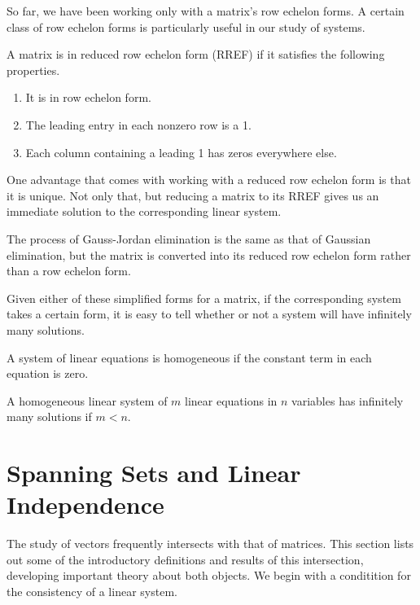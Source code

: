 \documentclass[../m73main.tex]{subfiles}
\begin{document}
So far, we have been working only with a matrix's row echelon forms.
A certain class of row echelon forms is particularly useful in our study of systems.

\begin{definition}
	A matrix is in reduced row echelon form (RREF) if it satisfies the following properties.
	\begin{enumerate}
		\item It is in row echelon form.
		\item The leading entry in each nonzero row is a 1.
		\item Each column containing a leading 1 has zeros everywhere else.
	\end{enumerate}
\end{definition}

One advantage that comes with working with a reduced row echelon form is that it is unique.
Not only that, but reducing a matrix to its RREF gives us an immediate solution to the corresponding linear system.

\begin{definition}
	The process of Gauss-Jordan elimination is the same as that of Gaussian elimination, but the matrix is converted into its reduced row echelon form rather than a row echelon form.
\end{definition}

Given either of these simplified forms for a matrix, if the corresponding system takes a certain form, it is easy to tell whether or not a system will have infinitely many solutions.

\begin{definition}
	A system of linear equations is homogeneous if the constant term in each equation is zero.
\end{definition}

\begin{theorem}
	A homogeneous linear system of $m$ linear equations in $n$ variables has infinitely many solutions if $m < n$.
\end{theorem}

\section{Spanning Sets and Linear Independence}
The study of vectors frequently intersects with that of matrices.
This section lists out some of the introductory definitions and results of this intersection, developing important theory about both objects.
We begin with a conditition for the consistency of a linear system.
\end{document}
